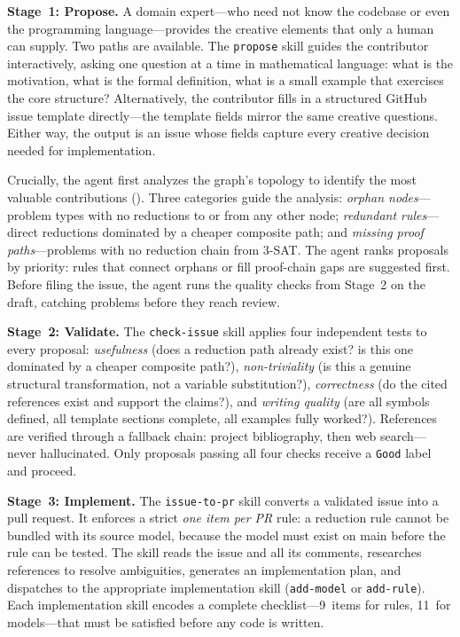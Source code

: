 \documentclass[conference]{IEEEtran}
\begin{document}
\textbf{Stage~1: Propose.}
A domain expert---who need not know the codebase or even the programming language---provides the creative elements that only a human can supply.
Two paths are available.
The \texttt{propose} skill guides the contributor interactively, asking one question at a time in mathematical language: what is the motivation, what is the formal definition, what is a small example that exercises the core structure?
Alternatively, the contributor fills in a structured GitHub issue template directly---the template fields mirror the same creative questions.
Either way, the output is an issue whose fields capture every creative decision needed for implementation.

Crucially, the agent first analyzes the graph's topology to identify the most valuable contributions ().
Three categories guide the analysis:
\emph{orphan nodes}---problem types with no reductions to or from any other node;
\emph{redundant rules}---direct reductions dominated by a cheaper composite path;
and \emph{missing proof paths}---problems with no reduction chain from 3-SAT.
The agent ranks proposals by priority: rules that connect orphans or fill proof-chain gaps are suggested first.
Before filing the issue, the agent runs the quality checks from Stage~2 on the draft, catching problems before they reach review.

\textbf{Stage~2: Validate.}
The \texttt{check-issue} skill applies four independent tests to every proposal: \emph{usefulness} (does a reduction path already exist? is this one dominated by a cheaper composite path?), \emph{non-triviality} (is this a genuine structural transformation, not a variable substitution?), \emph{correctness} (do the cited references exist and support the claims?), and \emph{writing quality} (are all symbols defined, all template sections complete, all examples fully worked?).
References are verified through a fallback chain: project bibliography, then web search---never hallucinated.
Only proposals passing all four checks receive a \texttt{Good} label and proceed.

\textbf{Stage~3: Implement.}
The \texttt{issue-to-pr} skill converts a validated issue into a pull request.
It enforces a strict \emph{one item per PR} rule: a reduction rule cannot be bundled with its source model, because the model must exist on main before the rule can be tested.
The skill reads the issue and all its comments, researches references to resolve ambiguities, generates an implementation plan, and dispatches to the appropriate implementation skill (\texttt{add-model} or \texttt{add-rule}).
Each implementation skill encodes a complete checklist---9~items for rules, 11~for models---that must be satisfied before any code is written.
\end{document}
